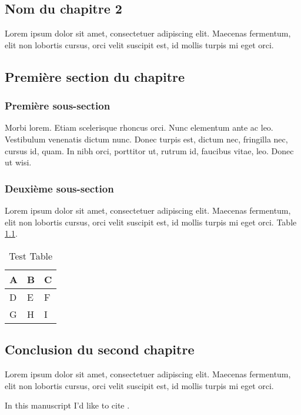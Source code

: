 \begin{bibunit}

\chapter[SHORT-Nom-du-chapitre-2]{Nom du chapitre 2}
\label{chap:2}

Lorem ipsum dolor sit amet, consectetuer adipiscing elit. Maecenas fermentum, elit non lobortis cursus, orci velit suscipit est, id mollis turpis mi eget orci. 

\section{Première section du chapitre}

\subsection{Première sous-section}

Morbi lorem. Etiam scelerisque rhoncus orci. Nunc elementum ante ac leo. Vestibulum venenatis dictum nunc. Donec turpis est, dictum nec, fringilla nec, cursus id, quam. In nibh orci, porttitor ut, rutrum id, faucibus vitae, leo. Donec ut wisi.

\subsection{Deuxième sous-section}

Lorem ipsum dolor sit amet, consectetuer adipiscing elit. Maecenas fermentum, elit non lobortis cursus, orci velit suscipit est, id mollis turpis mi eget orci. Table \ref{table1}.

\begin{table}[hbt]
\begin{center}
\begin{tabular}{|l|l|l|}
\hline
A & B & C \\ \hline
D & E & F \\ \hline
G & H & I \\ \hline
\end{tabular}
\caption{Test Table}
\label{table1}
\end{center}
\end{table}

\section{Conclusion du second chapitre}

Lorem ipsum dolor sit amet, consectetuer adipiscing elit. Maecenas fermentum, elit non lobortis cursus, orci velit suscipit est, id mollis turpis mi eget orci.

In this manuscript I'd like to cite \cite{remo1,remo5}.

\end{bibunit}